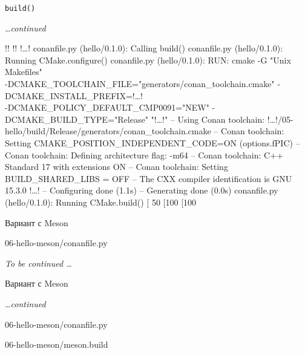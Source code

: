 \documentclass[compress, 8pt, aspectratio=169]{beamer}
\begin{document}
\begin{frame}[fragile]{\texttt{build()}}

  \textit{\dots continued}\bigbreak

  {\small
  \begin{terminalwindow}[!!][minted options={escapeinside=!!, firstline=11}]
!!
!!
!\dots!
conanfile.py (hello/0.1.0): Calling build()
conanfile.py (hello/0.1.0): Running CMake.configure()
conanfile.py (hello/0.1.0): RUN: cmake -G "Unix Makefiles"\\
-DCMAKE_TOOLCHAIN_FILE="generators/conan_toolchain.cmake"
-DCMAKE_INSTALL_PREFIX=!\dots!\\
-DCMAKE_POLICY_DEFAULT_CMP0091="NEW"
-DCMAKE_BUILD_TYPE="Release" "!\dots!"
-- Using Conan toolchain: !\dots!/05-hello/build/Release/generators/conan_toolchain.cmake
-- Conan toolchain: Setting CMAKE_POSITION_INDEPENDENT_CODE=ON (options.fPIC)
-- Conan toolchain: Defining architecture flag: -m64
-- Conan toolchain: C++ Standard 17 with extensions ON
-- Conan toolchain: Setting BUILD_SHARED_LIBS = OFF
-- The CXX compiler identification is GNU 15.3.0
!\dots!
-- Configuring done (1.1s)
-- Generating done (0.0s)
conanfile.py (hello/0.1.0): Running CMake.build()
[ 50%
[100%
[100%
  \end{terminalwindow}
  }

\end{frame}

\begin{frame}[fragile]{Вариант с Meson}

    {06-hello-meson/conanfile.py}

  \textit{To be continued \dots}

\end{frame}

\begin{frame}[fragile]{Вариант с Meson}

  \textit{\dots continued}\bigbreak

    {06-hello-meson/conanfile.py}

  \bigbreak

    {06-hello-meson/meson.build}

\end{frame}
\end{document}

